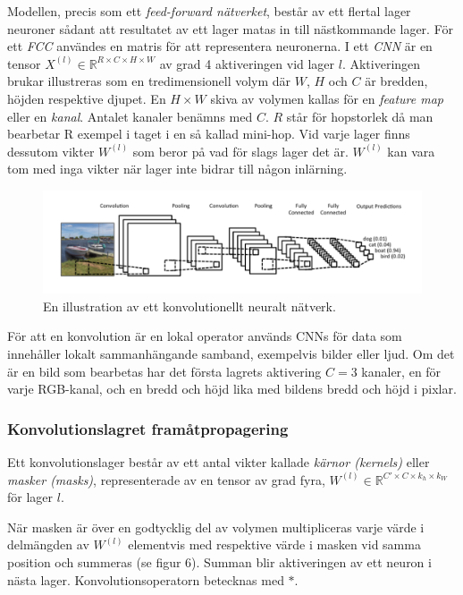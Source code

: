 \documentclass[a4paper,11pt,twoside]{article}
\begin{document}
Modellen, precis som ett \textit{feed-forward nätverket}, består av ett flertal lager neuroner sådant att resultatet av ett lager matas in till nästkommande lager. För ett \textit{FCC} användes en matris för att representera neuronerna. I ett \textit{CNN} är en tensor $X^{(l)} \in \mathbb{R}^{R \times C  \times H \times W}$ av grad 4 aktiveringen vid lager $l$. Aktiveringen brukar illustreras som en tredimensionell volym där $W$, $H$ och $C$ är bredden, höjden respektive djupet. En $H \times W$ skiva av volymen kallas för en \textit{feature map} eller en \textit{kanal}. Antalet kanaler benämns med $C$. $R$ står för hopstorlek då man bearbetar R exempel i taget i en så kallad mini-hop. Vid varje lager finns dessutom vikter $W^{(l)}$  som beror på vad för slags lager det är. $W^{(l)}$ kan vara tom med inga vikter när lager inte bidrar till någon inlärning. \cite{cs231n} \cite{convmath}

\begin{figure}[h]\label{figboatcnn}
	\centering
  		\includegraphics[scale=0.6]{boatcnn.png}
  	\caption{En illustration av ett konvolutionellt neuralt nätverk. \cite{figboatcnn}}
\end{figure}

För att en konvolution är en lokal operator används CNNs för data som innehåller lokalt sammanhängande samband, exempelvis bilder eller ljud. Om det är en bild som bearbetas har det första lagrets aktivering $C = 3$ kanaler, en för varje RGB-kanal, och en bredd och höjd lika med bildens bredd och höjd i pixlar. \cite{cs231n} \cite{convmath}

\subsubsection{Konvolutionslagret framåtpropagering}
Ett konvolutionslager består av ett antal vikter kallade \textit{kärnor (kernels)} eller \textit{masker (masks)}, representerade av en tensor av grad fyra, $W^{(l)} \in \mathbb{R}^{C' \times C  \times k_h \times k_W}$ för lager $l$. \cite{cs231n} \cite{convmath}

När masken är över en godtycklig del av volymen multipliceras varje värde i delmängden av $W^{(l)}$ elementvis med respektive värde i masken vid samma position och summeras (se figur 6). Summan blir aktiveringen av ett neuron i nästa lager. Konvolutionsoperatorn betecknas med $*$. \cite{cs231n} \cite{convmath}
\end{document}
